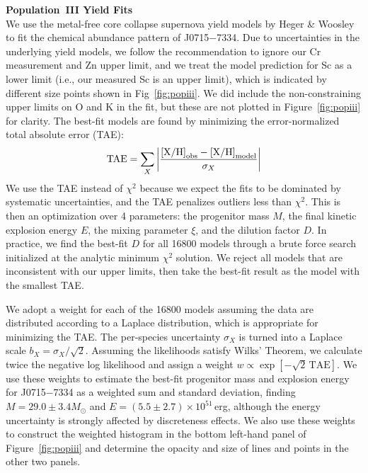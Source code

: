 \documentclass{natureprintstyle}
\newcommand{\umpstar}{J0715$-$7334\xspace}
\begin{document}
\vspace{1mm}
\noindent
{\bf Population~III Yield Fits}
\\
\noindent
We use the metal-free core collapse supernova yield models by Heger \& Woosley\cite{Heger2010} to fit the chemical abundance pattern of \umpstar.
Due to uncertainties in the underlying yield models, we follow the recommendation to ignore our Cr measurement and Zn upper limit, and we treat the model prediction for Sc as a lower limit (i.e., our measured Sc is an upper limit), which is indicated by different size points shown in Fig~\ref{fig:popiii}.
We did include the non-constraining upper limits on O and K in the fit, but these are not plotted in Figure~\ref{fig:popiii} for clarity.
The best-fit models are found by minimizing the error-normalized total absolute error (TAE)\cite{Ji2024}:
\begin{equation*}
    \text{TAE} = \sum_X \left| \frac{\text{[X/H]}_{\rm obs} - \text{[X/H]}_{\rm model}}{\sigma_X}\right|
\end{equation*}
We use the TAE instead of $\chi^2$ because we expect the fits to be dominated by systematic uncertainties, and the TAE penalizes outliers less than $\chi^2$.
This is then an optimization over 4 parameters: the progenitor mass $M$, the final kinetic explosion energy $E$, the mixing parameter $\xi$, and the dilution factor $D$. In practice, we find the best-fit $D$ for all 16800 models through a brute force search initialized at the analytic minimum $\chi^2$ solution. We reject all models that are inconsistent with our upper limits, then take the best-fit result as the model with the smallest TAE.

We adopt a weight for each of the 16800 models assuming the data are distributed according to a Laplace distribution, which is appropriate for minimizing the TAE. The per-species uncertainty $\sigma_X$ is turned into a Laplace scale $b_X=\sigma_X/\sqrt{2}$. Assuming the likelihoods satisfy Wilks' Theorem\cite{Wilks1938}, we calculate twice the negative log likelihood and assign a weight $w \propto \exp\left[-\sqrt{2}\, \text{TAE} \right]$.
We use these weights to estimate the best-fit progenitor mass and explosion energy for \umpstar as a weighted sum and standard deviation, finding $M = 29.0 \pm 3.4 M_\odot$ and $E = (5.5 \pm 2.7) \times 10^{51}$\,erg, although the energy uncertainty is strongly affected by discreteness effects.
We also use these weights to construct the weighted histogram in the bottom left-hand panel of Figure~\ref{fig:popiii} and determine the opacity and size of lines and points in the other two panels.
\end{document}
